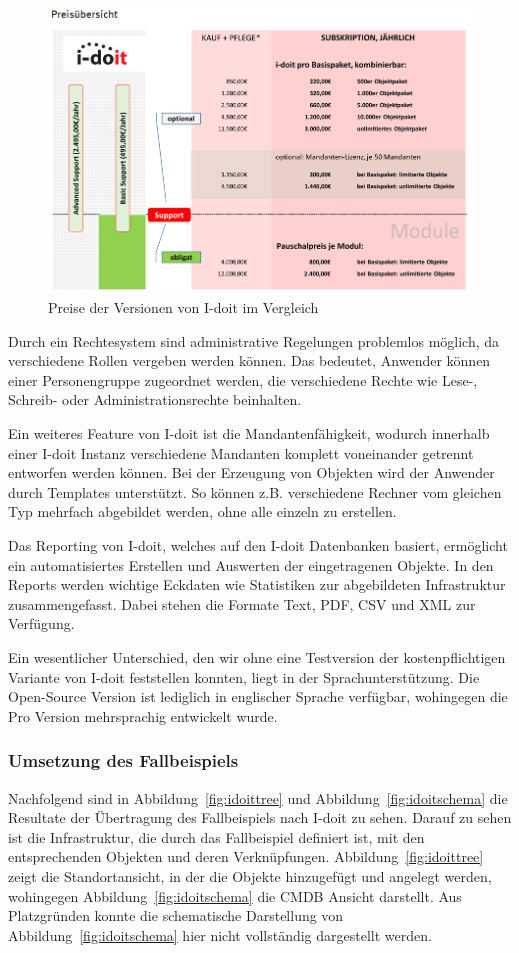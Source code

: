 \begin{figure}[htbp]
\includegraphics[width=\textwidth]{images/idoitpreis}
\caption{Preise der Versionen von I-doit im Vergleich}
\label{fig:idoitpreis}
\end{figure}

Durch ein Rechtesystem sind administrative Regelungen problemlos möglich, da verschiedene Rollen vergeben werden können.
Das bedeutet, Anwender können einer Personengruppe zugeordnet werden, die verschiedene Rechte wie Lese-, Schreib- oder Administrationsrechte beinhalten.

Ein weiteres Feature von I-doit ist die Mandantenfähigkeit, wodurch innerhalb einer I-doit Instanz verschiedene Mandanten komplett voneinander getrennt entworfen werden können.
Bei der Erzeugung von Objekten wird der Anwender durch Templates unterstützt.
So können z.B. verschiedene Rechner vom gleichen Typ mehrfach abgebildet werden, ohne alle einzeln zu erstellen.

Das Reporting von I-doit, welches auf den I-doit Datenbanken basiert, ermöglicht ein automatisiertes Erstellen und Auswerten der eingetragenen Objekte.
In den Reports werden wichtige Eckdaten wie Statistiken zur abgebildeten Infrastruktur zusammengefasst.
Dabei stehen die Formate Text, PDF, CSV und XML zur Verfügung.

Ein wesentlicher Unterschied, den wir ohne eine Testversion der kostenpflichtigen Variante von I-doit feststellen konnten, liegt in der Sprachunterstützung.
Die Open-Source Version ist lediglich in englischer Sprache verfügbar, wohingegen die Pro Version mehrsprachig entwickelt wurde.


\subsubsection{Umsetzung des Fallbeispiels}
Nachfolgend sind in Abbildung~\ref{fig:idoittree} und Abbildung~\ref{fig:idoitschema} die Resultate der Übertragung des Fallbeispiels nach I-doit zu sehen.
Darauf zu sehen ist die Infrastruktur, die durch das Fallbeispiel definiert ist, mit den entsprechenden Objekten und deren Verknüpfungen.
Abbildung~\ref{fig:idoittree} zeigt die Standortansicht, in der die Objekte hinzugefügt und angelegt werden, wohingegen Abbildung~\ref{fig:idoitschema} die CMDB Ansicht darstellt.
Aus Platzgründen konnte die schematische Darstellung von Abbildung~\ref{fig:idoitschema} hier nicht vollständig dargestellt werden.

